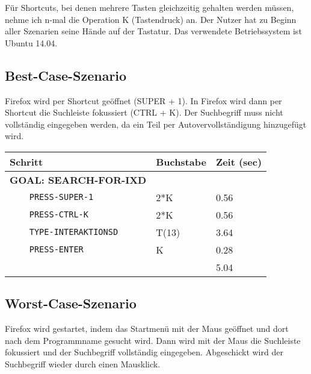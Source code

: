 \documentclass[a4paper,10pt]{article}
\begin{document}
\kopf
\renewcommand{\figurename}{Abbildung}

Für Shortcuts, bei denen mehrere Tasten gleichzeitig gehalten werden müssen, nehme ich n-mal die Operation K (Tastendruck) an. Der Nutzer hat zu Beginn aller Szenarien seine Hände auf der Tastatur. Das verwendete Betriebssystem ist Ubuntu 14.04.

\subsection*{Best-Case-Szenario}
Firefox wird per Shortcut geöffnet (SUPER + 1). In Firefox wird dann per Shortcut die Suchleiste fokussiert (CTRL + K). Der Suchbegriff muss nicht vollständig eingegeben werden, da ein Teil per Autovervollständigung hinzugefügt wird. \\

\begin{tabular}{l|l|l}
Schritt & Buchstabe & Zeit (sec) \\ \hline 
\textbf{GOAL: SEARCH-FOR-IXD} & & \\
\verb|    PRESS-SUPER-1| & 2*K & 0.56 \\ 
\verb|    PRESS-CTRL-K| & 2*K & 0.56 \\ 
\verb|    TYPE-INTERAKTIONSD| & T(13) & 3.64 \\
\verb|    PRESS-ENTER| & K & 0.28 \\ 
\hline & & 5.04
\end{tabular}


\subsection*{Worst-Case-Szenario}
Firefox wird gestartet, indem das Startmenü mit der Maus geöffnet und dort nach dem Programmname gesucht wird. Dann wird mit der Maus die Suchleiste fokussiert und der Suchbegriff vollständig eingegeben. Abgeschickt wird der Suchbegriff wieder durch einen Mausklick. \\
\end{document}
